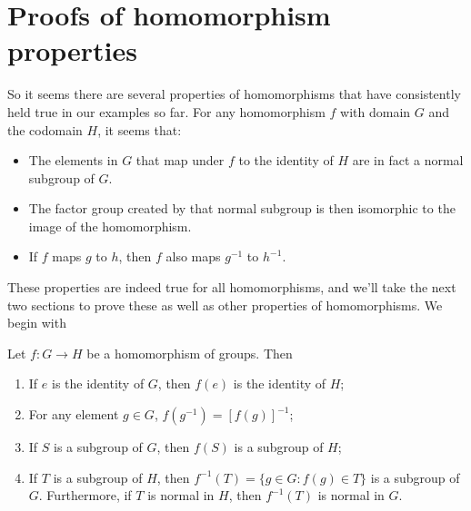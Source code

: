 



 

 

\section{Proofs of homomorphism properties}

So it seems there are several properties of homomorphisms that have consistently held true in our examples so far.  
For any  homomorphism $f$ with domain $G$ and the codomain $H$, it seems that:


\begin{itemize}
\item
The elements in $G$ that map under $f$ to the identity of $H$ are in fact a normal subgroup of $G$.
\item
The factor group created by that normal subgroup is then isomorphic to the image of the homomorphism.
\item
If $f$ maps $g$ to $h$, then $f$ also maps $g^{-1}$ to $h^{-1}$.
\end{itemize}

These properties are indeed true for all homomorphisms, and we'll take the next two sections to prove these as well as other properties of homomorphisms.  
We begin with 
 
\begin{thmprop}\label{HomorphismSubgroupProp}
Let $f : G \rightarrow H$ be a homomorphism of groups. Then 
\begin{enumerate}
 
\item
If $e$ is the identity of $G$, then $f( e)$ is the identity of
$H$;  
 
\item
For any element $g \in G$, $f( g^{-1}) = [f( g )]^{- 1}$;
 
\item
If $S$ is a subgroup of $G$, then $f(S )$ is a subgroup of
$H$;
 
\item \label{normal_kernel}
If $T$ is a  subgroup of $H$, then $f^{-1}(T) = \{ g \in G :
f(g) \in T \}$ is a subgroup of $G$. Furthermore, if $T$ is
normal in $H$, then $f^{-1}(T)$ is normal in $G$. 
 
\end{enumerate}
\end{thmprop}
 
